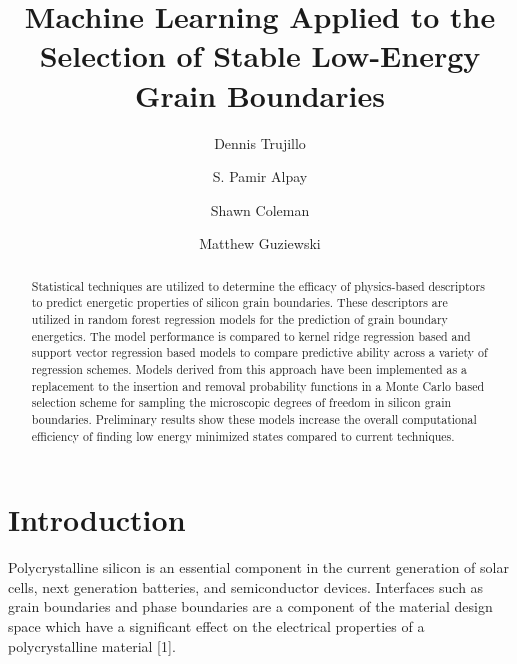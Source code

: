 \documentclass[aip,reprint,longbibliography,amsmath,amssymb,twocolumn,superscriptaddress]{revtex4-1}
\begin{document}
\title{Machine Learning Applied to the Selection of Stable Low-Energy Grain Boundaries}
\author{Dennis Trujillo}
\author{S. Pamir Alpay}
\author{Shawn Coleman}
\author{Matthew Guziewski}



\begin{abstract}
Statistical techniques are utilized to determine the efficacy of physics-based descriptors to predict energetic properties of silicon grain boundaries. 
%
These descriptors are utilized in random forest regression models for the prediction of grain boundary energetics. 
%
The model performance is compared to kernel ridge regression based and support vector regression based models to compare predictive ability across a variety of regression schemes. 
%
Models derived from this approach have been implemented as a replacement to the insertion and removal probability functions in a Monte Carlo based selection scheme for sampling the microscopic degrees of freedom in silicon grain boundaries.  
%
Preliminary results show these models increase the overall computational efficiency of finding low energy minimized states compared to current techniques. 
\end{abstract}

\maketitle 

\section{Introduction}
Polycrystalline silicon is an essential component in the current generation of solar cells, next generation batteries, and semiconductor devices. 
%
Interfaces such as grain boundaries and phase boundaries are a component of the material design space which have a significant effect on the electrical properties of a polycrystalline material [1]. 
\end{document}
